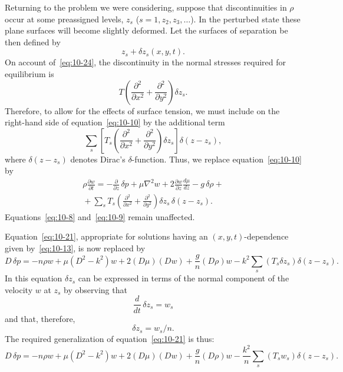 Returning to the problem we were considering, suppose that discontinuities in $\rho$ occur at some preassigned levels, $z_s$ ($s = 1, z_2, z_3, \ldots$). In the perturbed state these plane surfaces will become slightly deformed. Let the surfaces of separation be then defined by
\begin{equation}
\label{eq:10-25}
z_s+\delta z_s(x,y,t).
\end{equation}
On account of~\eqref{eq:10-24}, the discontinuity in the normal stresses required for equilibrium is
\begin{equation}
\label{eq:10-26}
T\!\left(\frac{\partial^2}{\partial x^2}+\frac{\partial^2}{\partial y^2}\right)\!\delta z_s.
\end{equation}
Therefore, to allow for the effects of surface tension, we must include on the right-hand side of equation~\eqref{eq:10-10} by the additional term
\begin{equation}
\label{eq:10-27}
\sum_s\left[T_s\!\left(\frac{\partial^2}{\partial x^2}+\frac{\partial^2}{\partial y^2}\right)\!\delta z_s\right]\delta(z-z_s),
\end{equation}
where $\delta(z-z_s)$ denotes Dirac's $\delta$-function. Thus, we replace equation~\eqref{eq:10-10} by
\begin{align}
\label{eq:10-28}
\rho\frac{\partial w}{\partial t} = -\frac{\partial}{\partial z}\,\delta p + \mu\nabla^2 w + 2\frac{\partial w}{\partial z}\frac{d\mu}{dz} - g\,\delta\rho + {} \nonumber\\
{} + \sum_s T_s\!\left(\frac{\partial^2}{\partial x^2}+\frac{\partial^2}{\partial y^2}\right)\!\delta z_s\,\delta(z-z_s).
\end{align}
Equations~\eqref{eq:10-8} and~\eqref{eq:10-9} remain unaffected.

Equation~\eqref{eq:10-21}, appropriate for solutions having an $(x,y,t)$-dependence given by~\eqref{eq:10-13}, is now replaced by
\begin{equation}
\label{eq:10-29}
D\,\delta p = -n\rho w + \mu(D^2-k^2)w + 2(D\mu)(Dw) + \frac{g}{n}(D\rho)w - k^2\sum_s (T_s\delta z_s)\delta(z-z_s).
\end{equation}
In this equation $\delta z_s$ can be expressed in terms of the normal component of the velocity $w$ at $z_s$ by observing that
\begin{equation}
\label{eq:10-30}
\frac{d}{dt}\,\delta z_s = w_s
\end{equation}
and that, therefore,
\begin{equation}
\label{eq:10-31}
\delta z_s = w_s/n.
\end{equation}
The required generalization of equation~\eqref{eq:10-21} is thus:
\begin{equation}
\label{eq:10-32}
D\,\delta p = -n\rho w + \mu(D^2-k^2)w + 2(D\mu)(Dw) + \frac{g}{n}(D\rho)w - \frac{k^2}{n}\sum_s (T_s w_s)\delta(z-z_s).
\end{equation}


